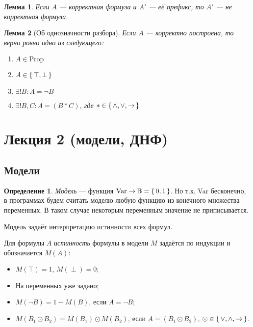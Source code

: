 \documentclass[12pt]{article}
\let\im\rightarrow
\let\la\land
\let\lv\lor
\let\n\neg
\theoremstyle{definition}
\newtheorem{definition}{Определение}[section]
\theoremstyle{plain}
\newtheorem{lemma}{Лемма}[section]
\theoremstyle{remark}
\begin{document}
\begin{lemma}
  Если $A$ --- корректная формула и $A'$ --- её префикс, то $A'$ ---
  не корректная формула.
\end{lemma}

\begin{lemma}[Об однозначности разбора]
  Если $A$ --- корректно построена, то верно ровно одно из следующего:
  \begin{enumerate}
    \item $A \in \mathrm{Prop}$

    \item $A \in \set{\top, \perp}$

    \item $\exists! B \colon A = \n B$

    \item $\exists! B, C \colon A = (B * C)$, где $* \in \set{\la, \lv, \im}$
  \end{enumerate}
\end{lemma}

\pagebreak

\section{Лекция 2 (модели, ДНФ)}

\subsection{Модели}

\begin{definition}
  \textit{Модель} --- функция $\mathrm{Var} \to \mathbb{B} = \set{0,
  1}$. Но т.к. Var бесконечно, в программах будем считать моделю
  любую функцию из конечного множества переменных. В таком случае
  некоторым переменным значение не приписывается.
\end{definition}

Модель задаёт интерпретацию истинности всех формул.

Для формулы $A$ \textit{истинность} формулы в модели $M$ задаётся по
индукции и обозначается $M(A)$:
\begin{itemize}
  \item $M(\top) = 1$, $M(\perp) = 0$;

  \item На переменных уже задано;

  \item $M(\n B) = 1 - M(B)$, если $A = \n B$;

  \item $M(B_1 \odot B_2) = M(B_1) \odot M(B_2)$, если $A = (B_1
    \odot B_2)$, $\odot \in \set{\lor, \land, \im}$.
\end{itemize}
\end{document}
